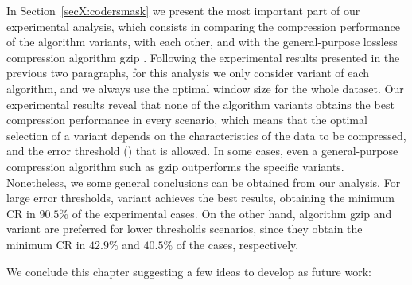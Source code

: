 In Section~\ref{secX:codersmask} we present the most important part of our experimental analysis, which consists in comparing the compression performance of the algorithm variants, with each other, and with the general-purpose lossless compression algorithm gzip \cite{gzip}. Following the experimental results presented in the previous two paragraphs, for this analysis we only consider variant \maskalgo of each algorithm, and we always use the optimal window size for the whole dataset. Our experimental results reveal that none of the algorithm variants obtains the best compression performance in every scenario, which means that the optimal selection of a variant depends on the characteristics of the data to be compressed, and the error threshold (\maxerror) that is allowed. In some cases, even a general-purpose compression algorithm such as gzip outperforms the specific variants. Nonetheless, we some general conclusions can be obtained from our analysis. For large error thresholds, variant  achieves the best results, obtaining the minimum CR in $90.5\%$ of the experimental cases. On the other hand, algorithm gzip and variant  are preferred for lower thresholds scenarios, since they obtain the minimum CR in $42.9\%$ and $40.5\%$ of the cases, respectively.


\clearpage

We conclude this chapter suggesting a few ideas to develop as future work:

\vspace{-5pt}


